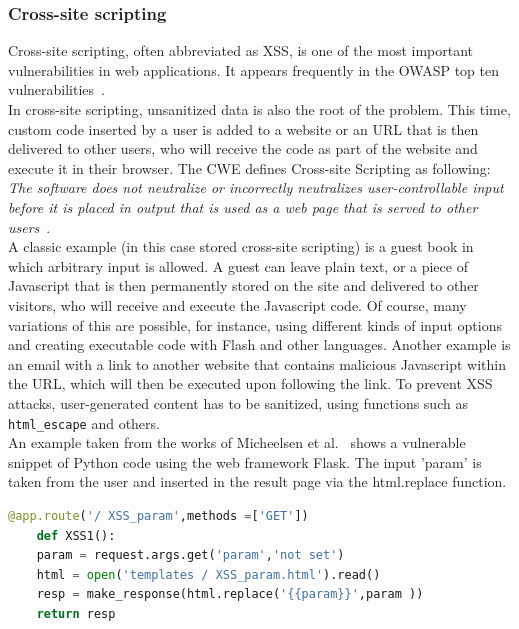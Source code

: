 \documentclass[
a4paper,
pagesize,
pdftex,
12pt,
twoside, %
BCOR=5mm, %
ngerman,
fleqn,
final,
]{scrartcl}
\begin{document}
	\subsubsection{Cross-site scripting}
	Cross-site scripting, often abbreviated as XSS, is one of the most important vulnerabilities in web applications. It appears frequently in the OWASP top ten vulnerabilities~\cite{OWASPFoundation.}.\\
	In cross-site scripting, unsanitized data is also the root of the problem. This time, custom code inserted by a user is added to a website or an URL that is then delivered to other users, who will receive the code as part of the website and execute it in their browser. The CWE defines Cross-site Scripting as following: \textit{The software does not neutralize or incorrectly neutralizes user-controllable input before it is placed in output that is used as a web page that is served to other users}~\cite{CommonWeaknessEnumeration.19.09.2019}.\\
	A classic example (in this case stored cross-site scripting) is a guest book in which arbitrary input is allowed. A guest can leave plain text, or a piece of Javascript that is then permanently stored on the site and delivered to other visitors, who will receive and execute the Javascript code. Of course, many variations of this are possible, for instance, using different kinds of input options and creating executable code with Flash and other languages. Another example is an email with a link to another website that contains malicious Javascript within the URL, which will then be executed upon following the link. 
	To prevent XSS attacks, user-generated content has to be sanitized, using functions such as \texttt{html\_escape} and others.\\
	An example taken from the works of Micheelsen et al.~\cite{Micheelsen.2016} shows a vulnerable snippet of Python code using the web framework Flask. The input 'param' is taken from the user and inserted in the result page via the html.replace function.
	\begin{lstlisting}[language=Python, showstringspaces=False]
	@app.route('/ XSS_param',methods =['GET'])
	def XSS1():
	param = request.args.get('param','not set')
	html = open('templates / XSS_param.html').read()
	resp = make_response(html.replace('{{param}}',param ))
	return resp
	\end{lstlisting}
	
	
\end{document}
